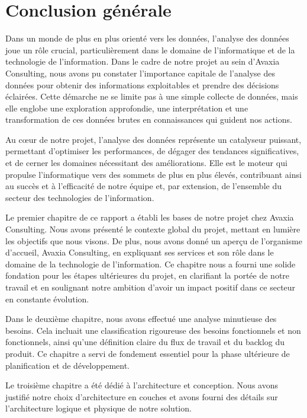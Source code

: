 \chapter*{Conclusion générale}

\par Dans un monde de plus en plus orienté vers les données, l'analyse des données joue un rôle crucial, particulièrement dans le domaine de l'informatique et de la technologie de l'information. Dans le cadre de notre projet au sein d'Avaxia Consulting, nous avons pu constater l'importance capitale de l'analyse des données pour obtenir des informations exploitables et prendre des décisions éclairées. Cette démarche ne se limite pas à une simple collecte de données, mais elle englobe une exploration approfondie, une interprétation et une transformation de ces données brutes en connaissances qui guident nos actions.
\par Au cœur de notre projet, l'analyse des données représente un catalyseur puissant, permettant d'optimiser les performances, de dégager des tendances significatives, et de cerner les domaines nécessitant des améliorations. Elle est le moteur qui propulse l'informatique vers des sommets de plus en plus élevés, contribuant ainsi au succès et à l'efficacité de notre équipe et, par extension, de l'ensemble du secteur des technologies de l'information.
\par Le premier chapitre de ce rapport a établi les bases de notre projet chez Avaxia Consulting. Nous avons présenté le contexte global du projet, mettant en lumière les objectifs que nous visons. De plus, nous avons donné un aperçu de l'organisme d'accueil, Avaxia Consulting, en expliquant ses services et son rôle dans le domaine de la technologie de l'information. Ce chapitre nous a fourni une solide fondation pour les étapes ultérieures du projet, en clarifiant la portée de notre travail et en soulignant notre ambition d'avoir un impact positif dans ce secteur en constante évolution.
\par Dans le deuxième chapitre, nous avons effectué une analyse minutieuse des besoins. Cela incluait une classification rigoureuse des besoins fonctionnels et non fonctionnels, ainsi qu'une définition claire du flux de travail et du backlog du produit. Ce chapitre a servi de fondement essentiel pour la phase ultérieure de planification et de développement.

\par Le troisième chapitre a été dédié à l'architecture et conception. Nous avons justifié notre choix d'architecture en couches et avons fourni des détails sur l'architecture logique et physique de notre solution.

